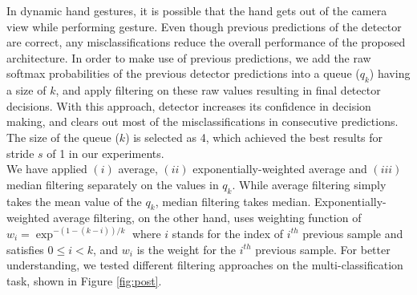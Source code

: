 In dynamic hand gestures, it is possible that the hand gets out of the camera view  while performing gesture. Even though previous predictions of the detector are correct, any misclassifications reduce the overall performance of the proposed architecture. In order to make use of previous predictions, we add the raw softmax probabilities of the previous detector predictions into a queue ($q_k$) having a size of $k$, and apply filtering on these raw values resulting in final detector decisions. With this approach, detector increases its confidence in decision making, and clears out most of the misclassifications in consecutive predictions. The size of the queue ($k$) is selected as 4, which achieved the best results for stride $s$ of 1 in our experiments. \\

We have applied $(i)$ average, $(ii)$ exponentially-weighted average and $(iii)$ median filtering separately on the values in $q_k$. While average filtering simply takes the mean value of the $q_k$, median filtering takes median. Exponentially-weighted average filtering, on the other hand, uses weighting function of  $w_i = \exp^{-{{(1-(k-i))}/k}}$ where $i$ stands for the index of $i^{th}$ previous sample and satisfies $0 \leq i < k$, and $w_i$ is the weight for the $i^{th}$ previous sample. For better understanding, we tested different filtering approaches on the multi-classification task, shown in Figure \ref{fig:post}. \\




